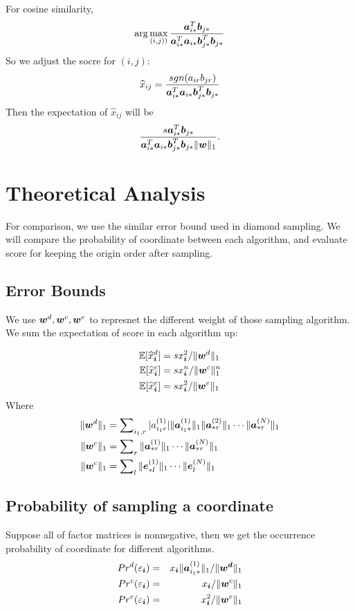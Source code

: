 \documentclass[letterpaper]{article}
\newcommand{\Sca}[3]{{#1}^{(#2)}_{i_#2#3}}%
\newcommand{\V}[1]{{\bm{{\MakeLowercase{#1}}}}}
\newcommand{\VnC}[3]{\V{#1}^{(#2)}_{#3}}
\newcommand{\Varow}[1]{\V{a}^{(#1)}_{i_#1*}}
\newcommand{\Vacol}[1]{\V{a}^{(#1)}_{*r}}
\newcommand{\norm}[2]{\|#1\|_{#2}}
\begin{document}
For cosine similarity,
\[
\arg\max_{(i,j))}\frac{\V{a}_{i*}^T\V{b}_{j*}}
{\V{a}_{i*}^T\V{a}_{i*}\V{b}_{j*}^T\V{b}_{j*}}
\]
So we adjust the socre for $(i,j)$:
\[
\widehat{x}_{ij} =\frac{sgn(a_{ir}b_{jr})}{\V{a}_{i*}^T\V{a}_{i*}\V{b}_{j*}^T\V{b}_{j*}}
\]
Then the expectation of $\widehat{x}_{ij}$ will be 
\[
\frac{s\V{a}_{i*}^T\V{b}_{j*}}
{\V{a}_{i*}^T\V{a}_{i*}\V{b}_{j*}^T\V{b}_{j*}\norm{\V{w}}{1}}.
\]

\section{Theoretical Analysis}

For comparison, we use the similar error bound used in diamond sampling. 
We will compare the probability of coordinate between each algorithm, and evaluate score for keeping the origin order after sampling.

\subsection{Error Bounds}
We use $\V{w}^d,\V{w}^c,\V{w}^e$ to represnet the different weight of those sampling algorithm.
We sum the expectation of score in each algorithm up:

\begin{align}
    \mathbb{E}[\widehat{x}_{\V{i}}^d] &= sx^2_{\V{i}}/\norm{\V{W}^d}{1} \\
    \mathbb{E}[\widehat{x}_{\V{i}}^c] &= sx^n_{\V{i}}/\norm{\V{W}^c}{1}^n\\
    \mathbb{E}[\widehat{x}_{\V{i}}^e] &= sx_{\V{i}}^2/\norm{\V{w}^e}{1} 
\end{align}
Where
\begin{align*}
    \norm{\V{W}^d}{1} &= \sum\nolimits_{i_1,r}
        |\Sca{a}{1}{r}|\norm{\Varow{1}}{1}\norm{\Vacol{2}}{1}\cdots\norm{\Vacol{N}}{1}\\
    \norm{\V{W}^c}{1} &= \sum\nolimits_{r}
        \norm{\Vacol{1}}{1}\cdots\norm{\Vacol{N}}{1}\\
    \norm{\V{W}^c}{1} &= \sum\nolimits_{l}
        \norm{\VnC{e}{1}{*l}}{1}\cdots\norm{\VnC{e}{N}{l}}{1}
\end{align*}

\subsection{Probability of sampling a coordinate}

Suppose all of factor matrices is nonnegative, then we get the occurrence probability of coordinate for different algorithms.
\begin{eqnarray}
    \label{eq:ProbabilityDianomd}
    Pr^d(\varepsilon_{\V{i}}) & = & x_\V{i}\norm{\Varow{1}}{1}/\norm{\V{W^d}}{1}\\
    \label{eq:ProbabilityCentral}
    Pr^c(\varepsilon_{\V{i}}) & = & x_{\V{i}}/\norm{\V{W}^c}{1}\\
    \label{eq:ProbabilityExtensiom}
    Pr^e(\varepsilon_{\V{i}}) & = & x_{\V{i}}^2/\norm{\V{w}^e}{1}
\end{eqnarray}
\end{document}
